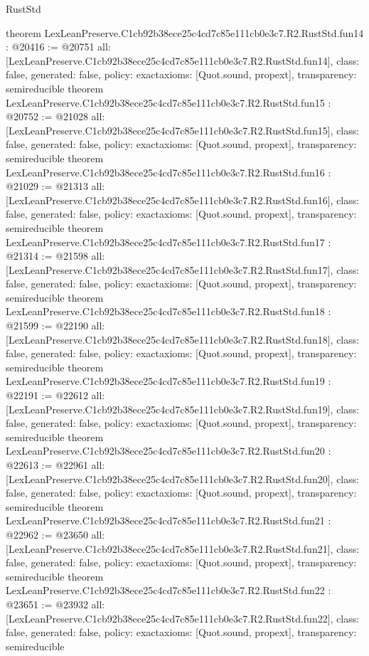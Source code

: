 \begin{lexlean}{RustStd}
\begin{coremodule}
{}
theorem LexLeanPreserve.C1cb92b38ece25c4cd7c85e111cb0e3c7.R2.RustStd.fun14 : @20416 := @20751 {
  all: [LexLeanPreserve.C1cb92b38ece25c4cd7c85e111cb0e3c7.R2.RustStd.fun14],
  class: false,
  generated: false,
  policy: exact{axioms: [Quot.sound, propext]},
  transparency: semireducible
}
theorem LexLeanPreserve.C1cb92b38ece25c4cd7c85e111cb0e3c7.R2.RustStd.fun15 : @20752 := @21028 {
  all: [LexLeanPreserve.C1cb92b38ece25c4cd7c85e111cb0e3c7.R2.RustStd.fun15],
  class: false,
  generated: false,
  policy: exact{axioms: [Quot.sound, propext]},
  transparency: semireducible
}
theorem LexLeanPreserve.C1cb92b38ece25c4cd7c85e111cb0e3c7.R2.RustStd.fun16 : @21029 := @21313 {
  all: [LexLeanPreserve.C1cb92b38ece25c4cd7c85e111cb0e3c7.R2.RustStd.fun16],
  class: false,
  generated: false,
  policy: exact{axioms: [Quot.sound, propext]},
  transparency: semireducible
}
theorem LexLeanPreserve.C1cb92b38ece25c4cd7c85e111cb0e3c7.R2.RustStd.fun17 : @21314 := @21598 {
  all: [LexLeanPreserve.C1cb92b38ece25c4cd7c85e111cb0e3c7.R2.RustStd.fun17],
  class: false,
  generated: false,
  policy: exact{axioms: [Quot.sound, propext]},
  transparency: semireducible
}
theorem LexLeanPreserve.C1cb92b38ece25c4cd7c85e111cb0e3c7.R2.RustStd.fun18 : @21599 := @22190 {
  all: [LexLeanPreserve.C1cb92b38ece25c4cd7c85e111cb0e3c7.R2.RustStd.fun18],
  class: false,
  generated: false,
  policy: exact{axioms: [Quot.sound, propext]},
  transparency: semireducible
}
theorem LexLeanPreserve.C1cb92b38ece25c4cd7c85e111cb0e3c7.R2.RustStd.fun19 : @22191 := @22612 {
  all: [LexLeanPreserve.C1cb92b38ece25c4cd7c85e111cb0e3c7.R2.RustStd.fun19],
  class: false,
  generated: false,
  policy: exact{axioms: [Quot.sound, propext]},
  transparency: semireducible
}
theorem LexLeanPreserve.C1cb92b38ece25c4cd7c85e111cb0e3c7.R2.RustStd.fun20 : @22613 := @22961 {
  all: [LexLeanPreserve.C1cb92b38ece25c4cd7c85e111cb0e3c7.R2.RustStd.fun20],
  class: false,
  generated: false,
  policy: exact{axioms: [Quot.sound, propext]},
  transparency: semireducible
}
theorem LexLeanPreserve.C1cb92b38ece25c4cd7c85e111cb0e3c7.R2.RustStd.fun21 : @22962 := @23650 {
  all: [LexLeanPreserve.C1cb92b38ece25c4cd7c85e111cb0e3c7.R2.RustStd.fun21],
  class: false,
  generated: false,
  policy: exact{axioms: [Quot.sound, propext]},
  transparency: semireducible
}
theorem LexLeanPreserve.C1cb92b38ece25c4cd7c85e111cb0e3c7.R2.RustStd.fun22 : @23651 := @23932 {
  all: [LexLeanPreserve.C1cb92b38ece25c4cd7c85e111cb0e3c7.R2.RustStd.fun22],
  class: false,
  generated: false,
  policy: exact{axioms: [Quot.sound, propext]},
  transparency: semireducible
}
\end{coremodule}
\end{lexlean}
